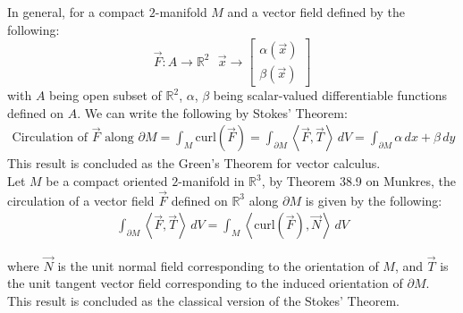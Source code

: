\documentclass[15pt]{book}
\theoremstyle{break}
\theoremstyle{break}
\newcommand{\R}{\mathbb{R}}
\newcommand{\bmat}[1]{\begin{bmatrix} #1 \end{bmatrix}}
\begin{document}
In general, for a compact $2$-manifold $M$ and a vector field defined by the following:
$$\vec{F}:A \to \R^2 \ \ \ \vec{x} \to \bmat{\alpha(\vec{x})\\\beta(\vec{x})}$$ 
with $A$ being open subset of $\R^2$, $\alpha$, $\beta$ being scalar-valued differentiable functions defined on $A$. We can write the following by Stokes' Theorem:
\begin{align*}
\text{Circulation of }\vec{F}\text{ along }\partial M = \int_M \text{curl}( \vec{F}) = \int_{\partial M} \left< \vec{F},\vec{T}\right> \, dV = \int_{\partial M} \alpha\, dx + \beta\, dy
\end{align*}
This result is concluded as the Green's Theorem for vector calculus.\\

Let $M$ be a compact oriented $2$-manifold in $\R^3$, by Theorem 38.9 on Munkres, the circulation of a vector field $\vec{F}$ defined on $\R^3 $ along $\partial M$ is given by the following:
\begin{align*}
\int_{\partial M}\left< \vec{F}, \vec{T}\right> \, dV = \int_{M}\left< \text{curl}(\vec{F}), \vec{N}\right>\, dV
\end{align*}


where $\vec{N}$ is the unit normal field corresponding to the orientation of $M$, and $\vec{T}$ is the unit tangent vector field corresponding to the induced orientation of $\partial M$. This result is concluded as the classical version of the Stokes' Theorem. \\
\end{document}
